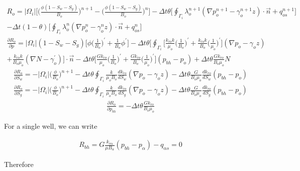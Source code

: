 \documentclass[12pt]{article}
\begin{document}
\begin{multline}	\label{o2a}
R_o = |\Omega_i|\Big[\Big(\frac{\phi (1-S_w-S_g)}{B_o}\Big)^{n+1}-\Big(\frac{\phi (1-S_w-S_g)}{B_o}\Big)^n\Big] - \Delta t\theta\Big[\oint_{\Gamma_i}\lambda^{n+1}_o(\nabla p^{n+1}_o-\gamma^{n+1}_oz)\cdot\vec{n}+ q^{n+1}_{os}\Big]  \\
- \Delta t(1-\theta)\Big[\oint_{\Gamma_i}\lambda^{n}_o(\nabla p^{n}_o-\gamma^n_oz)\cdot\vec{n}+q^{n}_{os}\Big]
\end{multline}
%
\begin{multline}
\frac{\partial R_o}{\partial p} = |\Omega_i|(1-S_w-S_g)\Big[\phi \big(\frac{1}{B_o}\big)^\prime +\frac{1}{B_o}\phi^\prime\Big] - \Delta t\theta\Bigg[\oint_{\Gamma_i}\Big[\frac{k_{ro}k}{\mu_o}\big(\frac{1}{B_o}\big)^\prime+\frac{k_{ro}k}{B_o}\big(\frac{1}{\mu_o}\big)^\prime\Big](\nabla p_o -\gamma_o z) \\
+\frac{k_{ro}k}{B_o\mu_o}(\nabla N-\gamma_o^\prime) \Bigg]\cdot\vec{n} - \Delta t\theta\Big[\frac{Gk_{ro}}{\mu_o}\big(\frac{1}{B_o}\big)^\prime + \frac{Gk_{ro}}{B_o}\big(\frac{1}{\mu_o}\big)^\prime\Big](p_{bh}-p_o)+ \Delta t\theta\frac{Gk_{ro}}{B_o\mu_o}N
\end{multline}
%
\begin{multline}
\frac{\partial R_o}{\partial S_w} = -|\Omega_i|\Big(\frac{\phi }{B_o}\Big)^{n+1}- \Delta t\theta\oint_{\Gamma_i}\frac{k}{\mu_oB_o}\frac{d k_{ro}}{d S_w}(\nabla p_o-\gamma_oz) -\Delta t\theta\frac{G}{B_o\mu_o}\frac{dk_{ro}}{dS_w}(p_{bh}-p_o)
\end{multline}
%
\begin{multline}
\frac{\partial R_o}{\partial S_g} = -|\Omega_i|\Big(\frac{\phi }{B_o}\Big)^{n+1}- \Delta t\theta\oint_{\Gamma_i}\frac{k}{\mu_oB_o}\frac{d k_{ro}}{d S_g}(\nabla p_o-\gamma_oz) -\Delta t\theta\frac{G}{B_o\mu_o}\frac{dk_{ro}}{dS_g}(p_{bh}-p_o)
\end{multline}
%
\begin{multline}
\frac{\partial R_o}{\partial p_{bh}} = -\Delta t\theta\frac{Gk_{ro}}{B_o\mu_o}
\end{multline}

For a single well, we can write

\begin{equation}
\begin{split}
R_{bh} = G \frac{k_{r\alpha}}{\mu B_\alpha}(p_{bh}-p_{\alpha})-q_{\alpha s} =0
\end{split}
\end{equation}

Therefore
\end{document}
